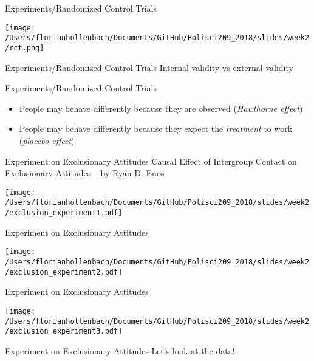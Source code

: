 \documentclass[presentation]{beamer}
\begin{document}
\begin{frame}[label={sec:org54befa2}]{Experiments/Randomized Control Trials}
\begin{center}
\texttt{[image: /Users/florianhollenbach/Documents/GitHub/Polisci209\_2018/slides/week2/rct.png]}
\end{center}
\end{frame}


\begin{frame}[label={sec:org3177bd8}]{Experiments/Randomized Control Trials}
\Large{Internal validity vs external validity}
\end{frame}


\begin{frame}[label={sec:org653865f}]{Experiments/Randomized Control Trials}
\begin{itemize}
\item People may behave differently because they are observed (\emph{Hawthorne effect})
\item People may behave differently because they expect the \emph{treatment} to work (\emph{placebo effect})
\end{itemize}
\end{frame}

\begin{frame}[label={sec:org81eb5fc}]{Experiment on Exclusionary Attitudes}
Causal Effect of Intergroup Contact on Exclusionary Attitudes -- by Ryan D. Enos
\begin{center}
\texttt{[image: /Users/florianhollenbach/Documents/GitHub/Polisci209\_2018/slides/week2/exclusion\_experiment1.pdf]}
\end{center}
\end{frame}

\begin{frame}[label={sec:org77aecc9}]{Experiment on Exclusionary Attitudes}
\begin{center}
\texttt{[image: /Users/florianhollenbach/Documents/GitHub/Polisci209\_2018/slides/week2/exclusion\_experiment2.pdf]}
\end{center}
\end{frame}


\begin{frame}[label={sec:org0f6ed4a}]{Experiment on Exclusionary Attitudes}
\begin{center}
\texttt{[image: /Users/florianhollenbach/Documents/GitHub/Polisci209\_2018/slides/week2/exclusion\_experiment3.pdf]}
\end{center}
\end{frame}


\begin{frame}[label={sec:org0307523}]{Experiment on Exclusionary Attitudes}
\LARGE{Let's look at the data!}
\end{frame}
\end{document}
